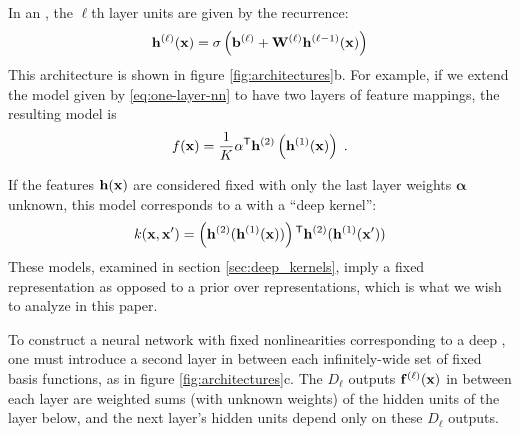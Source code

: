 \documentclass[twoside]{article}
\makeatletter
\newlength{\nonHumbleHeight}
\def\@humbleformat#1{{\settoheight{\nonHumbleHeight}{#1}\resizebox{!}{0.94\nonHumbleHeight}{#1}}}%
\newcommand\humble[1]{{\@humbleformat{#1}}}%
\newcommand{\gp}{{\humble{GP}}}
\newcommand{\MLP}{{\humble{MLP}}}
\newcommand{\hphi}{h}
\newcommand{\hPhi}{\vh}
\newcommand{\layerindex}{\ell}
\makeatother
\begin{document}
In an \MLP{}, the $\layerindex$th layer units are given by the recurrence:
%
\begin{align}
\vh^{(\layerindex)}(\vx) = \sigma \left( \vb^{(\layerindex)} + \vW^{(\layerindex)} \vh^{(\layerindex-1)}(\vx) \right)
\label{eq:nextlayer}
\end{align}
This architecture is shown in figure \ref{fig:architectures}b. 
%
For example, if we extend the model given by \eqref{eq:one-layer-nn} to have two layers of feature mappings,  the resulting model is
%
\begin{align}
f(\vx) = \frac{1}{K}{\mathbf \alpha}\tra \hPhi^{(2)}\left( \hPhi^{(1)}(\vx) \right) \;.
\label{eq:mutli-layer-nn}
\end{align}

If the features ${\bf{h}}({\bf{x}})$ are considered fixed with only the last layer weights ${\mathbf \alpha}$ unknown, this model corresponds to a \gp{} with a ``deep kernel'': 
\begin{align}
k(\vx, \vx') = \left( \hPhi^{(2)} ( \hPhi^{(1)}(\vx) ) \right) \tra \hPhi^{(2)} (\hPhi^{(1)}(\vx') )
\end{align}
These models, examined in section \ref{sec:deep_kernels}, imply a fixed representation as opposed to a prior over representations, which is what we wish to analyze in this paper.


 

To construct a neural network with fixed nonlinearities corresponding to a deep \gp{}, 
one must introduce a second layer in between each infinitely-wide set of fixed basis functions, as in figure \ref{fig:architectures}c.
The $D_\layerindex$ outputs $\vf^{(\layerindex)}(\vx)$ in between each layer are weighted sums (with unknown weights) of the hidden units of the layer below, and the next layer's hidden units depend only on these $D_\layerindex$ outputs.
%
\end{document}
